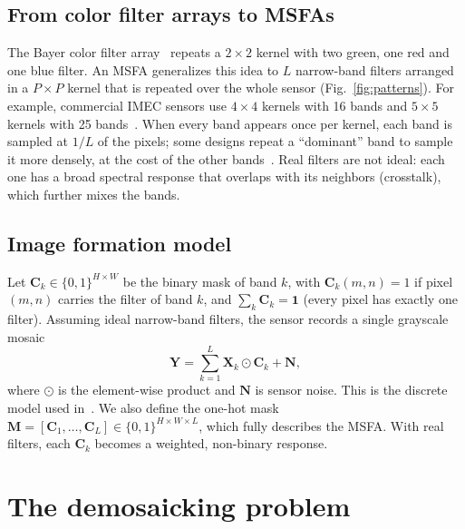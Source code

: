 \documentclass{article}
\def\X{{\mathbf X}}
\def\Y{{\mathbf Y}}
\def\C{{\mathbf C}}
\def\M{{\mathbf M}}
\def\N{{\mathbf N}}
\begin{document}
\subsection{From color filter arrays to MSFAs}

The Bayer color filter array~\cite{bayer1976} repeats a $2\times2$ kernel with
two green, one red and one blue filter. An MSFA generalizes this idea to $L$
narrow-band filters arranged in a $P\times P$ kernel that is repeated over the
whole sensor (Fig.~\ref{fig:patterns}). For example, commercial IMEC sensors
use $4\times4$ kernels with 16 bands and $5\times5$ kernels with 25
bands~\cite{geelen2014}. When every band appears once per kernel, each band
is sampled at $1/L$ of the pixels; some designs repeat a ``dominant'' band to
sample it more densely, at the cost of the other bands~\cite{miao2006}.
Real filters are not ideal: each one has a broad spectral response that
overlaps with its neighbors (crosstalk), which further mixes the bands.

\subsection{Image formation model}

Let $\C_k\in\{0,1\}^{H\times W}$ be the binary mask of band $k$, with
$\C_k(m,n)=1$ if pixel $(m,n)$ carries the filter of band $k$, and
$\sum_k\C_k=\mathbf{1}$ (every pixel has exactly one filter). Assuming ideal
narrow-band filters, the sensor records a single grayscale mosaic
\begin{equation}
  \Y = \sum_{k=1}^{L} \X_k \odot \C_k + \N,
  \label{eq:model}
\end{equation}
where $\odot$ is the element-wise product and $\N$ is sensor noise. This is
the discrete model used in~\cite{diaz2023}. We also define the one-hot mask
$\M=[\C_1,\dots,\C_L]\in\{0,1\}^{H\times W\times L}$, which fully describes
the MSFA. With real filters, each $\C_k$ becomes a weighted, non-binary
response.

\section{The demosaicking problem}
\label{sec:demosaicking}
\end{document}
